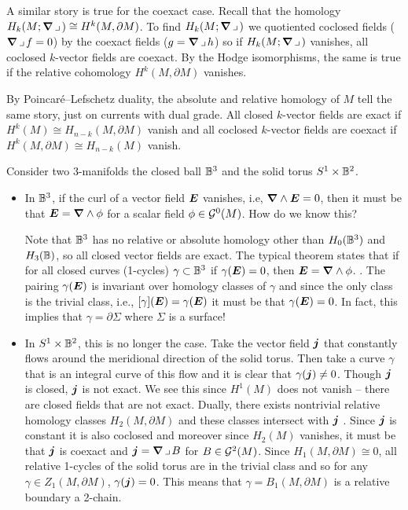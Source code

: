 \documentclass{article}
\begin{document}
A similar story is true for the coexact case. Recall that the homology $H_k(M;\boldsymbol{\nabla} \hspace*{.5mm}\lrcorner \hspace*{.5mm})\cong H^k(M,\partial M)$. To find $H_k(M;\boldsymbol{\nabla} \hspace*{.5mm}\lrcorner \hspace*{.5mm})$ we quotiented coclosed fields ($\boldsymbol{\nabla} \hspace*{.5mm}\lrcorner \hspace*{.5mm} f = 0$) by the coexact fields ($g=\boldsymbol{\nabla} \hspace*{.5mm}\lrcorner \hspace*{.5mm} h$) so if $H_k(M;\boldsymbol{\nabla} \hspace*{.5mm}\lrcorner \hspace*{.5mm})$ vanishes, all coclosed $k$-vector fields are coexact. By the Hodge isomorphisms, the same is true if the relative cohomology $H^k(M,\partial M)$ vanishes. 

By Poincar\'e--Lefschetz duality, the absolute and relative homology of $M$ tell the same story, just on currents with dual grade. All closed $k$-vector fields are exact if $H^k(M)\cong H_{n-k}(M,\partial M)$ vanish and all coclosed $k$-vector fields are coexact if $H^k(M, \partial M) \cong H_{n-k}(M)$ vanish.

\begin{example}
Consider two 3-manifolds the closed ball $\mathbb{B}^3$ and the solid torus $S^1 \times \mathbb{B}^2$. 
\begin{itemize}
    \item In $\mathbb{B}^3$, if the curl of a vector field $\boldsymbol{E}$ vanishes, i.e, $\boldsymbol{\nabla} \wedge \boldsymbol{E}=0$, then it must be that $\boldsymbol{E}=\boldsymbol{\nabla} \wedge \phi$ for a scalar field $\phi\in \mathcal{G}^0(M)$. How do we know this?
    
    Note that $\mathbb{B}^3$ has no relative or absolute homology other than $H_0(\mathbb{B}^3)$ and $H_3(\mathbb{B})$, so all closed vector fields are exact. The typical theorem states that if for all closed curves (1-cycles) $\gamma \subset \mathbb{B}^3$ if $\gamma(\boldsymbol{E})=0$, then $\boldsymbol{E}=\boldsymbol{\nabla} \wedge \phi$. . The pairing $\gamma(\boldsymbol{E})$ is invariant over homology classes of $\gamma$  and since the only class is the trivial class, i.e., $[\gamma](\boldsymbol{E})=\gamma(\boldsymbol{E})$ it must be that $\gamma(\boldsymbol{E})=0$. In fact, this implies that $\gamma = \partial \Sigma$ where $\Sigma$ is a surface! 
    
    \item In $S^1\times \mathbb{B}^2$, this is no longer the case. Take the vector field $\boldsymbol{j}$ that constantly flows around the meridional direction of the solid torus. Then take a curve $\gamma$ that is an integral curve of this flow and it is clear that $\gamma(\boldsymbol{j})\neq 0$. Though $\boldsymbol{j}$ is closed, $\boldsymbol{j}$ is not exact. We see this since $H^1(M)$ does not vanish -- there are closed fields that are not exact. Dually, there exists nontrivial relative homology classes $H_2(M,\partial M)$ and these classes intersect with $\boldsymbol{j}$ . Since $\boldsymbol{j}$ is constant it is also coclosed and moreover since $H_2(M)$ vanishes, it must be that $\boldsymbol{j}$ is coexact and $\boldsymbol{j}=\boldsymbol{\nabla} \hspace*{.5mm}\lrcorner \hspace*{.5mm} B$ for $B\in \mathcal{G}^2(M)$. Since $H_1(M,\partial M)\cong 0$, all relative 1-cycles of the solid torus are in the trivial class and so for any $\gamma \in Z_1(M,\partial M)$, $\gamma(\boldsymbol{j})=0$. This means that $\gamma=B_1(M,\partial M)$ is a relative boundary a 2-chain. 
\end{itemize}
\end{example}
\end{document}
